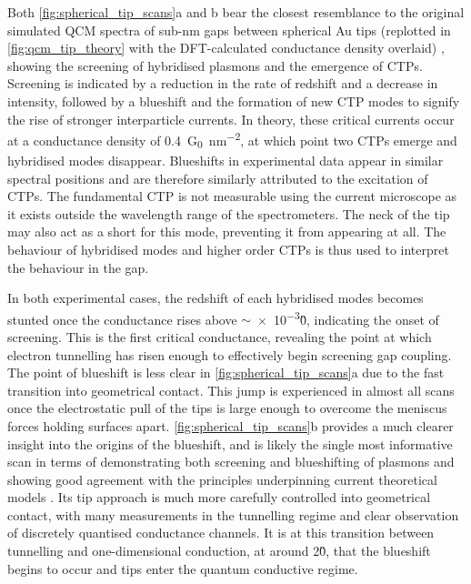 \documentclass[a4paper]{article}
\begin{document}
Both \autoref{fig:spherical_tip_scans}a and b bear the closest resemblance to the original simulated QCM spectra of sub-nm gaps between spherical Au tips (replotted in \autoref{fig:qcm_tip_theory} with the DFT-calculated conductance density overlaid) \cite{savage2012}, showing the screening of hybridised plasmons and the emergence of CTPs. Screening is indicated by a reduction in the rate of redshift and a decrease in intensity, followed by a blueshift and the formation of new CTP modes to signify the rise of stronger interparticle currents. In theory, these critical currents occur at a conductance density of \SI{0.4}{G_0.nm^{-2}}, at which point two CTPs emerge and hybridised modes disappear. Blueshifts in experimental data appear in similar spectral positions and are therefore similarly attributed to the excitation of CTPs. The fundamental CTP is not measurable using the current microscope as it exists outside the wavelength range of the spectrometers. The neck of the tip may also act as a short for this mode, preventing it from appearing at all. The behaviour of hybridised modes and higher order CTPs is thus used to interpret the behaviour in the gap.

In both experimental cases, the redshift of each hybridised modes becomes stunted once the conductance rises above $\sim$\num{e-3}\G0, indicating the onset of screening. This is the first critical conductance, revealing the point at which electron tunnelling has risen enough to effectively begin screening gap coupling. The point of blueshift is less clear in \autoref{fig:spherical_tip_scans}a due to the fast transition into geometrical contact. This jump is experienced in almost all scans once the electrostatic pull of the tips is large enough to overcome the meniscus forces holding surfaces apart. \autoref{fig:spherical_tip_scans}b provides a much clearer insight into the origins of the blueshift, and is likely the single most informative scan in terms of demonstrating both screening and blueshifting of plasmons and showing good agreement with the principles underpinning current theoretical models \cite{zuloaga2009, savage2012}. Its tip approach is much more carefully controlled into geometrical contact, with many measurements in the tunnelling regime and clear observation of discretely quantised conductance channels. It is at this transition between tunnelling and one-dimensional conduction, at around 2\G0, that the blueshift begins to occur and tips enter the quantum conductive regime.
\end{document}

